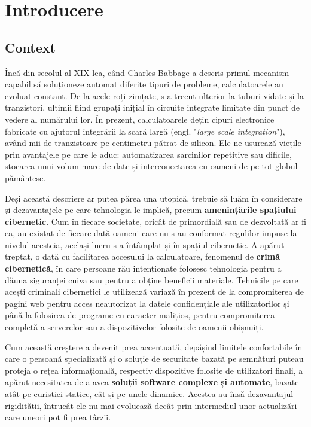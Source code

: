 \documentclass[../../main.tex]{subfiles}
\begin{document}
\chapter{Introducere}
\label{ch:introduction}

\section{Context}
\label{sec:introduction_context}

Încă din secolul al XIX-lea, când Charles Babbage a descris primul mecanism capabil să soluționeze automat diferite tipuri de probleme, calculatoarele au evoluat constant. De la acele roți zimțate, s-a trecut ulterior la tuburi vidate și la tranzistori, ultimii fiind grupați inițial în circuite integrate limitate din punct de vedere al numărului lor. În prezent, calculatoarele dețin cipuri electronice fabricate cu ajutorul integrării la scară largă (engl. "\textit{large scale integration}"), având mii de tranzistoare pe centimetru pătrat de silicon. Ele ne ușurează viețile prin avantajele pe care le aduc: automatizarea sarcinilor repetitive sau dificile, stocarea unui volum mare de date și interconectarea cu oameni de pe tot globul pământesc.

Deși această descriere ar putea părea una utopică, trebuie să luăm în considerare și dezavantajele pe care tehnologia le implică, precum \textbf{amenințările spațiului cibernetic}. Cum în fiecare societate, oricât de primordială sau de dezvoltată ar fi ea, au existat de fiecare dată oameni care nu s-au conformat regulilor impuse la nivelul acesteia, același lucru s-a întâmplat și în spațiul cibernetic. A apărut treptat, o dată cu facilitarea accesului la calculatoare, fenomenul de \textbf{crimă cibernetică}, în care persoane rău intenționate folosesc tehnologia pentru a dăuna siguranței cuiva sau pentru a obține beneficii materiale. Tehnicile pe care acești criminali cibernetici le utilizează variază în prezent de la compromiterea de pagini web pentru acces neautorizat la datele confidențiale ale utilizatorilor și până la folosirea de programe cu caracter malițios, pentru compromiterea completă a serverelor sau a dispozitivelor folosite de oamenii obișnuiți.

Cum această creștere a devenit prea accentuată, depășind limitele confortabile în care o persoană specializată și o soluție de securitate bazată pe semnături puteau proteja o rețea informațională, respectiv dispozitive folosite de utilizatori finali, a apărut necesitatea de a avea \textbf{soluții software complexe și automate}, bazate atât pe euristici statice, cât și pe unele dinamice. Acestea au însă dezavantajul rigidității, întrucât ele nu mai evoluează decât prin intermediul unor actualizări care uneori pot fi prea târzii.
\end{document}

